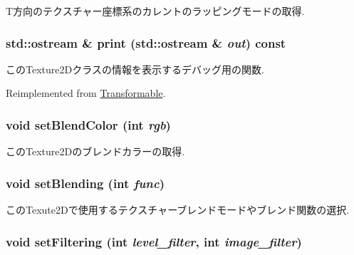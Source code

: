 T方向のテクスチャー座標系のカレントのラッピングモードの取得. \hypertarget{classm3g_1_1Texture2D_6fea17fa1532df3794f8cb39cb4f911f}{
\subsubsection[{print}]{\setlength{\rightskip}{0pt plus 5cm}std::ostream \& print (std::ostream \& {\em out}) const}}
\label{classm3g_1_1Texture2D_6fea17fa1532df3794f8cb39cb4f911f}


このTexture2Dクラスの情報を表示するデバッグ用の関数. 

Reimplemented from \hyperlink{classm3g_1_1Transformable_6fea17fa1532df3794f8cb39cb4f911f}{Transformable}.\hypertarget{classm3g_1_1Texture2D_b5a6333203f443fb1f66ea2e39d4de1b}{
\subsubsection[{setBlendColor}]{\setlength{\rightskip}{0pt plus 5cm}void setBlendColor (int {\em rgb})}}
\label{classm3g_1_1Texture2D_b5a6333203f443fb1f66ea2e39d4de1b}


このTexture2Dのブレンドカラーの取得. \hypertarget{classm3g_1_1Texture2D_189d98ce3e8ac7590be771944b3186d4}{
\subsubsection[{setBlending}]{\setlength{\rightskip}{0pt plus 5cm}void setBlending (int {\em func})}}
\label{classm3g_1_1Texture2D_189d98ce3e8ac7590be771944b3186d4}


このTexute2Dで使用するテクスチャーブレンドモードやブレンド関数の選択. \hypertarget{classm3g_1_1Texture2D_857574b5c0f3e0ca9239bafb4008cae1}{
\subsubsection[{setFiltering}]{\setlength{\rightskip}{0pt plus 5cm}void setFiltering (int {\em level\_\-filter}, \/  int {\em image\_\-filter})}}
\label{classm3g_1_1Texture2D_857574b5c0f3e0ca9239bafb4008cae1}


